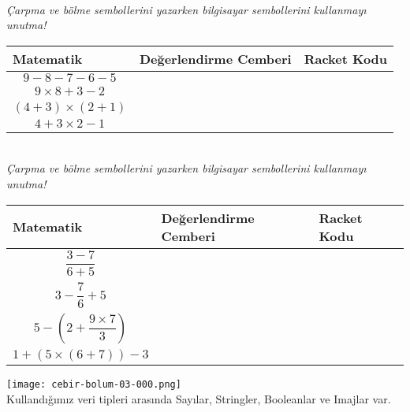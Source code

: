 \documentclass[12pt, a4paper]{article}
\begin{document}
\newpage
{}\\
\textit{Çarpma ve bölme sembollerini yazarken bilgisayar sembollerini kullanmayı unutma!}\\[2ex]
\begin{tabular}{| C{4cm} | C{6cm} | C{6cm} |  }
\hline
\bf Matematik&\bf Değerlendirme Cemberi&\bf Racket Kodu\\
\hline
\begin{displaymath} 9-8-7-6-5 \end{displaymath}  & &  \\[24ex]
\hline
\begin{displaymath} 9 \times 8 + 3 - 2 \end{displaymath} & &  \\[24ex]
\hline
\begin{displaymath} (4+3) \times (2+1) \end{displaymath}  & &  \\[24ex]
\hline
\begin{displaymath} 4+3 \times 2 - 1 \end{displaymath}   & &  \\[24ex]
\hline
\end{tabular}
\newpage
{}\\
\textit{Çarpma ve bölme sembollerini yazarken bilgisayar sembollerini kullanmayı unutma!}\\[2ex]
\begin{tabular}{| C{4cm} | C{6cm} | C{6cm} |  }
\hline
\bf Matematik&\bf Değerlendirme Cemberi&\bf Racket Kodu\\
\hline
\begin{displaymath} \frac {3 - 7 }{6 + 5} \end{displaymath}  & &  \\[24ex]
\hline
\begin{displaymath} 3 - \frac {7}{6} + 5 \end{displaymath} & &  \\[24ex]
\hline
\begin{displaymath} 5 - (2 + \frac{9 \times 7}{3}) \end{displaymath}  & &  \\[24ex]
\hline
\begin{displaymath} 1+(5 \times (6+7))-3 \end{displaymath}   & &  \\[24ex]
\hline
\end{tabular}
\newpage
\texttt{[image: cebir-bolum-03-000.png]}
\newpage
{}\\
Kullandığımız veri tipleri arasında Sayılar, Stringler, Booleanlar ve Imajlar var.
\end{document}
